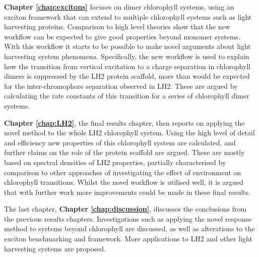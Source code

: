 \textbf{Chapter \ref{chap:excitons}} focuses on dimer chlorophyll systems, using an exciton
framework that can extend to multiple chlorophyll systems such as light harvesting
proteins. Comparison to high level theories show that the new workflow can be expected
to give good properties beyond monomer systems. With this workflow it starts to 
be possible to make novel arguments about light harvesting system phenomena. Specifically,
the new workflow is used to explain how the transition from vertical excitation 
to a charge separation in chlorophyll dimers is suppressed by the LH2 protein scaffold,
more than would be expected for the inter-chromophore separation observed in LH2.
These are argued by calculating the rate constants of this transition for a series
of chlorophyll dimer systems.

\textbf{Chapter \ref{chap:LH2}}, the final results chapter, then reports on applying the
novel method to the whole LH2 chlorophyll system. Using the high level of detail
and efficiency new properties of this chlorophyll system are calculated, and further
claims on the role of the protein scaffold are argued. These are mostly based on
spectral densities of LH2 properties, partially characterised by comparison to other
approaches of investigating the effect of environment on chlorophyll transitions.
Whilst the novel workflow is utilised well, it is argued that with further work
more improvements could be made in these final results.

The last chapter, \textbf{Chapter \ref{chap:discussion}}, discusses the conclusions
from the previous results chapters. Investigations such as applying the novel response
method to systems beyond chlorophyll are discussed, as well as alterations to the
exciton benchmarking and framework. More applications to LH2 and other light harvesting
systems are proposed.

